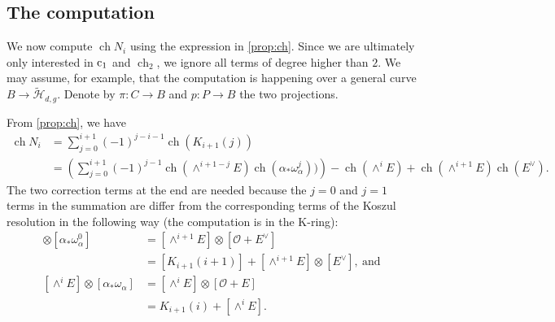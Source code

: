 \documentclass{amsart}
\DeclareMathOperator{\ch}{ch}
\renewcommand{\c}{{\rm c}}
\newcommand{\orb}{\mathcal}
\renewcommand{\O}{{\mathcal O}}
\providecommand {\from}{{\colon}}
\numberwithin{equation}{section}
\begin{document}
\subsection{The computation}
We now compute $\ch N_i$ using the expression in \autoref{prop:ch}.
Since we are ultimately only interested in $\c_1$ and $\ch_2$, we ignore all terms of degree higher than $2$.
We may assume, for example, that the computation is happening over a general curve $B \to \widetilde {\orb H}_{d,g}$.
Denote by $\pi \from C \to B$ and $p \from P \to B$ the two projections.


From \autoref{prop:ch}, we have
\begin{equation}\label{eqn:1}
  \begin{split}
  \ch N_i &=  \sum_{j=0}^{i+1} (-1)^{j-i-1} \ch \left(K_{i+1}(j)\right)\\
  &= \left(\sum_{j=0}^{i+1}(-1)^{j-1} \ch(\wedge^{i+1-j}E) \ch (\alpha_* \omega_\alpha^j)) \right) - \ch(\wedge^i E) + \ch(\wedge^{i+1}E) \ch(E^\vee).
\end{split}
\end{equation}
The two correction terms at the end are needed because the $j = 0$ and $j = 1$ terms in the summation are differ from the corresponding terms of the Koszul resolution in the following way (the computation is in the K-ring):
\begin{align*}
  [\wedge^{i+1}E] \otimes [\alpha_* \omega_\alpha^0] &= [\wedge^{i+1}E] \otimes [ \O + E^\vee] \\
  &= [K_{i+1}(i+1)] + [\wedge^{i+1}E]\otimes[E^\vee],\ \text{and}\\
  [\wedge^i E] \otimes [\alpha_* \omega_\alpha ] &= [\wedge^i E]\otimes[\O + E] \\
  &= K_{i+1}(i) + [\wedge^i E].
\end{align*}
\end{document}
